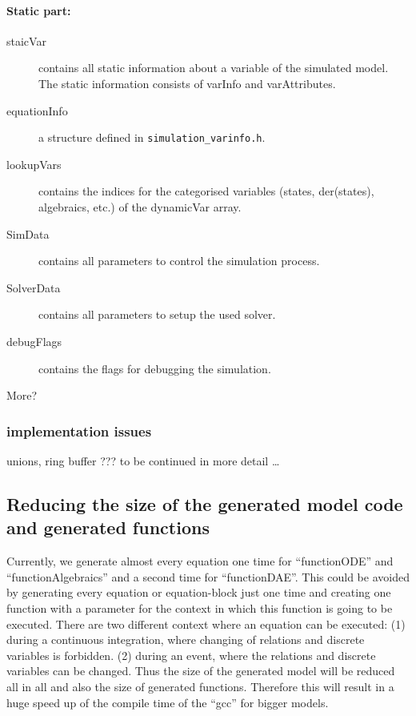 \paragraph{Static part:}
\begin{description}
\item[staicVar] contains all static information about a variable of the
simulated model. The static information consists of varInfo and varAttributes.
\item[equationInfo] a structure defined in \verb+simulation_varinfo.h+.
\item[lookupVars] contains the indices for the categorised variables (states,
der(states), algebraics, etc.) of the dynamicVar array. 
\item[SimData] contains all parameters to control the simulation process.
\item[SolverData] contains all parameters to setup the used solver.
\item[debugFlags] contains the flags for debugging the simulation.
\item[More?]
\end{description}

\subsubsection{implementation issues}

unions, ring buffer ???
to be continued in more detail \ldots


\subsection{Reducing the size of the generated model code and generated
functions}\label{sec:ReduceSize}

Currently, we generate almost every equation one time for ``functionODE'' and
``functionAlgebraics'' and a second time for ``functionDAE''. This could be
avoided by generating every equation or equation-block just one time and
creating one function with a parameter for the context in which this function
is going to be executed. There are two different context where an equation
can be executed: (1) during a continuous integration, where changing of
relations and discrete variables is forbidden. (2) during an event, where the
relations and discrete variables can be changed. 
Thus the size of the generated model will be reduced all in all and also the
size of generated functions. Therefore this will result in a huge speed
up of the compile time of the ``gcc'' for bigger models. 

